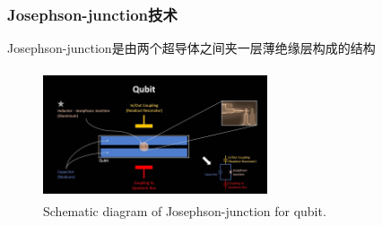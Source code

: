 \begin{frame}
	\frametitle{\textrm{Josephson-junction}技术}
		    \textrm{Josephson-junction}是由两个超导体之间夹一层薄绝缘层构成的结构\\
		    {\fontsize{7.5pt}{5.2pt}}
    \begin{figure}
        \centering
                \includegraphics[height=1.5in, width=2.6in, viewport=0 0 1400 744,clip]{Figures/Schematic-Josephson_junction-for-qubit.jpg}
		\caption{\tiny{\textrm{Schematic diagram of Josephson-junction for qubit.}}}
		\label{Fig:Josephson-junction}
    \end{figure}
	    \vskip -10pt
    {\fontsize{7.5pt}{5.2pt}}
\end{frame}


